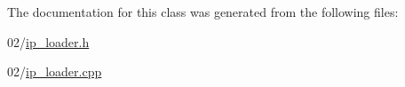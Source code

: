 The documentation for this class was generated from the following files\+:\begin{DoxyCompactItemize}
\item 
02/\hyperlink{02_2ip__loader_8h}{ip\+\_\+loader.\+h}\item 
02/\hyperlink{02_2ip__loader_8cpp}{ip\+\_\+loader.\+cpp}\end{DoxyCompactItemize}
